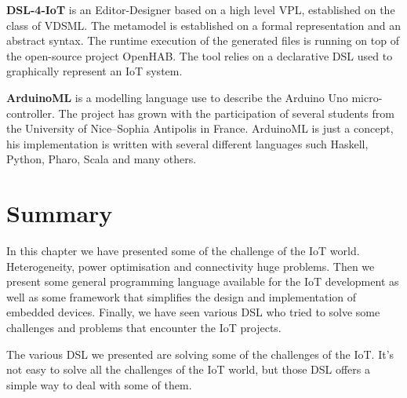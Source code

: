 \textbf{DSL-4-IoT} is an Editor-Designer based on a high level \gls{VPL},
established on the class of \gls{VDSML}\cite{Salihbegovic2015}. The metamodel is
established on a formal representation and an abstract syntax. The runtime execution of
the generated files is running on top of the open-source project
OpenHAB\cite{eichstadt2015openhab}. The tool relies on a declarative \gls{DSL}
used to graphically represent an \gls{IoT} system.

\textbf{ArduinoML} is a modelling language use to describe the Arduino Uno
micro-controller\cite{Mosser2014}. The project has grown with the participation
of several students from the University of Nice–Sophia Antipolis in France.
ArduinoML is just a concept, his implementation is written with several
different languages such Haskell, Python, Pharo, Scala and many
others\cite{Mooser2017}.

\section{Summary}
\label{sec:iot_dev_summary}

In this chapter we have presented some of the challenge of the \gls{IoT} world.
Heterogeneity, power optimisation and connectivity huge problems. Then we
present some general programming language available for the \gls{IoT}
development as well as some framework that simplifies the design and
implementation of embedded devices. Finally, we have seen various \gls{DSL} who
tried to solve some challenges and problems that encounter the \gls{IoT}
projects.

The various \gls{DSL} we presented are solving some of the challenges of the
\gls{IoT}. It’s not easy to solve all the challenges of the \gls{IoT} world, but
those \gls{DSL} offers a simple way to deal with some of them.


